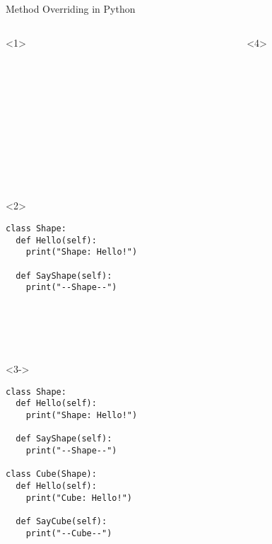 \begin{frame}[fragile]{Method Overriding in Python}

  \begin{columns}[onlytextwidth]
    \begin{column}{0.47\textwidth}

      \begin{onlyenv}<1>
        \begin{lstlisting}[style=python,basicstyle=\ttfamily\footnotesize]












 \end{lstlisting}
      \end{onlyenv}

      \begin{onlyenv}<2>
        \begin{lstlisting}[style=python,basicstyle=\ttfamily\footnotesize]
class Shape:
  def Hello(self):
    print("Shape: Hello!")

  def SayShape(self):
    print("--Shape--")






 \end{lstlisting}
      \end{onlyenv}

      \begin{onlyenv}<3->
        \begin{lstlisting}[style=python,basicstyle=\ttfamily\footnotesize]
class Shape:
  def Hello(self):
    print("Shape: Hello!")

  def SayShape(self):
    print("--Shape--")

class Cube(Shape):
  def Hello(self):
    print("Cube: Hello!")

  def SayCube(self):
    print("--Cube--") \end{lstlisting}
      \end{onlyenv}

    \end{column}


    \begin{column}{0.47\textwidth}

      \begin{onlyenv}<4>
        \begin{lstlisting}[style=python,basicstyle=\ttfamily\footnotesize]













\end{lstlisting}
\end{onlyenv}
\end{column}
\end{columns}
\end{frame}

